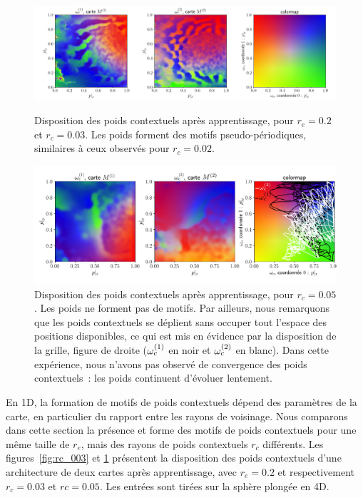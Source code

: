 \documentclass[../main]{subfiles}
\begin{document}
\begin{figure}[ht!]
\begin{minipage}{\textwidth}
	\includegraphics[width=\textwidth]{weights_contexte-0-048_rc003.png}
	\caption{Disposition des poids contextuels après apprentissage, pour $r_e = 0.2$ et $r_c = 0.03$. Les poids forment des motifs pseudo-périodiques, similaires à ceux observés pour $r_c = 0.02$. \label{fig:rc_003}}
\end{minipage}

\begin{minipage}{\textwidth}
	\includegraphics[width=\textwidth]{wc_rc005_grid.pdf}
	\caption{Disposition des poids contextuels après apprentissage, pour $r_c =0.05$. Les poids ne forment pas de motifs. Par ailleurs, nous remarquons que les poids contextuels se déplient sans occuper tout l'espace des positions disponibles, ce qui est mis en évidence par la disposition de la grille, figure de droite ($\omega_c^{({1})}$ en noir et $\omega_c^{({2})}$ en blanc).
	Dans cette expérience, nous n'avons pas observé de convergence des poids contextuels~: les poids continuent d'évoluer lentement.
	\label{fig:rc_005}}
\end{minipage}
\end{figure}

En 1D, la formation de motifs de poids contextuels dépend des paramètres de la carte, en particulier du rapport entre les rayons de voisinage.
Nous comparons dans cette section la présence et forme des motifs de poids contextuels pour une même taille de $r_e$, mais des rayons de poids contextuels $r_c$ différents.
Les figures~\ref{fig:rc_003} et \ref{fig:rc_005} présentent la disposition des poids contextuels d'une architecture de deux cartes après apprentissage, avec $r_e = 0.2$ et respectivement $r_c = 0.03$ et $rc = 0.05$. Les entrées sont tirées sur la sphère plongée en 4D.
\end{document}
